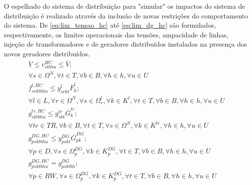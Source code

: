 O espelhado do sistema de distribuição para "simular" os impactos do sistema de distribuição é realizado através da inclusão de novas restrições do comportamento do sistema. De \eqref{eq:lim_tensao_hc} até \eqref{eq:lim_dg_hc} são formulados, respectivamente, os limites operacionais das tensões, ampacidade de linhas, injeção de transformadores e de geradores distribuídos instalados na presença dos novos geradores distribuídos.
 \begin{align}
    \underline{V} \leq v_{stbhu}^{HC} \leq \overline{V}; \nonumber\\  \forall s \in \Omega^N, \forall t \in T, \forall b \in B, \forall h \in h, \forall u \in U
    \label{eq:lim_tensao_hc}\\
   f^{l, HC}_{srktbhu} \leq y^l_{srkt} \overline{F}^l_k;  \nonumber\\ \forall l \in L, \forall r \in \Omega^N, \forall s \in \Omega^{l}_r, \forall k \in K^{l}, \forall t \in T, \forall b \in B, \forall h \in h, \forall u \in U
   \label{eq:amp_hc}\\
   g^{tr, HC}_{sktbhu} \leq y^{tr}_{skt} \overline{G}^{tr}_k;  \nonumber\\ \forall tr \in TR, \forall b \in B, \forall t \in T,  \forall s \in \Omega^{N}, \forall k \in K^{tr}, \forall h \in h, \forall u \in U 
   \label{eq:ijec_hc}\\
   g^{DG,HC}_{psktbhu} \leq y^{DG}_{pskt}\overline{G}^{DG}_{pk};  \nonumber\\ \forall p \in D, \forall s \in \Omega^{DG}_p, \forall k \in K^{DG}_p, \forall t \in T, \forall b \in B, \forall h \in h, \forall u \in U\\
   g^{DG,HC}_{psktbhu} = g^{DG}_{psktbh}; \nonumber\\ \forall p \in RW, \forall s \in \Omega^{DG}_p, \forall k \in K^{DG}_p, \forall t \in T, \forall b \in B, \forall h \in h, \forall u \in U
   \label{eq:lim_dg_hc}
\end{align}

